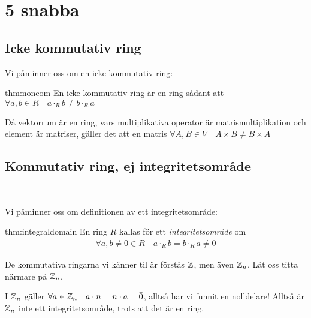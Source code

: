 \section{5 snabba}

\subsection{Icke kommutativ ring}
\par\bigskip
\noindent Vi påminner oss om en icke kommutativ ring:
\par\bigskip
\begin{theo}{thm:noncom}
  \noindent En icke-kommutativ ring är en ring sådant att $\forall a, b\in R\quad a\cdot_R b\neq b\cdot_R a$
\end{theo}
\par\bigskip
\noindent Då vektorrum är en ring, vars multiplikativa operator är matrismultiplikation och element är matriser, gäller det att en matris $\forall A,B\in V\quad A\times B \neq B\times A$
\par\bigskip

\subsection{Kommutativ ring, ej integritetsområde}\hfill\\
\par\bigskip
\noindent Vi påminner oss om definitionen av ett integritetsområde:
\par\bigskip
\begin{theo}[Integritetsområde]{thm:integraldomain}
  \noindent En ring $R$ kallas för ett \textit{integritetsområde} om
  \begin{equation*}
    \begin{gathered}
      \forall a,b\neq0\in R\quad a\cdot_R b = b\cdot_R a \neq0
    \end{gathered}
  \end{equation*}
\end{theo}
\par\bigskip
\noindent De kommutativa ringarna vi känner til är förstås $\mathbb{Z}$, men även $\mathbb{Z}_n$. Låt oss titta närmare på $\mathbb{Z}_n$.
\par\bigskip
\noindent I $\mathbb{Z}_n$ gäller $\forall a\in\mathbb{Z}_n\quad a\cdot n = n\cdot a = \bar{0}$, alltså har vi funnit en nolldelare! Alltså är $\mathbb{Z}_n$ inte ett integritetsområde, trots att det är en ring.
\par\bigskip

